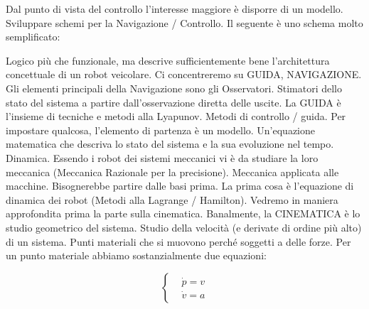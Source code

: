 Dal punto di vista del controllo l'interesse maggiore è disporre di un modello. Sviluppare schemi per la Navigazione / Controllo. Il seguente è uno schema molto semplificato:


Logico più che funzionale, ma descrive sufficientemente bene l'architettura concettuale di un robot veicolare. Ci concentreremo su GUIDA, NAVIGAZIONE. Gli elementi principali della Navigazione sono gli Osservatori. Stimatori dello stato del sistema a partire dall'osservazione diretta delle uscite. La GUIDA è l'insieme di tecniche e metodi alla Lyapunov. Metodi di controllo / guida. Per impostare qualcosa, l'elemento di partenza è un modello. Un'equazione matematica che descriva lo stato del sistema e la sua evoluzione nel tempo. Dinamica. Essendo i robot dei sistemi meccanici vi è da studiare la loro meccanica (Meccanica Razionale per la precisione). Meccanica applicata alle macchine. Bisognerebbe partire dalle basi prima. La prima cosa è l'equazione di dinamica dei robot (Metodi alla Lagrange / Hamilton). Vedremo in maniera approfondita prima la parte sulla cinematica. Banalmente, la CINEMATICA è lo studio geometrico del sistema. Studio della velocità (e derivate di ordine più alto) di un sistema. Punti materiali che si muovono perché soggetti a delle forze. Per un punto materiale abbiamo sostanzialmente due equazioni:

\[
	\left\{
	\begin{aligned}
	&\dot{p} = v\\
	&\dot{v} = a
	\end{aligned}
	\right.
\]

